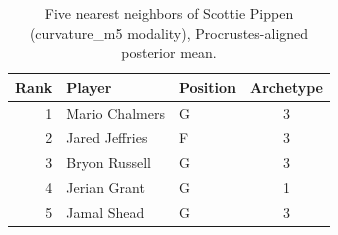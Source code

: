 \begin{table}[htbp]
  \centering\small
  \begin{tabular}{rllc}
    \toprule
    Rank & Player & Position & Archetype \\
    \midrule
    1 & Mario Chalmers & G & 3 \\
    2 & Jared Jeffries & F & 3 \\
    3 & Bryon Russell & G & 3 \\
    4 & Jerian Grant & G & 1 \\
    5 & Jamal Shead & G & 3 \\
    \bottomrule
  \end{tabular}
  \caption{Five nearest neighbors of Scottie Pippen (curvature_m5 modality), Procrustes-aligned posterior mean.}
  \label{tab:Scottie_Pippen_neighbors_curvature_m5}
\end{table}

